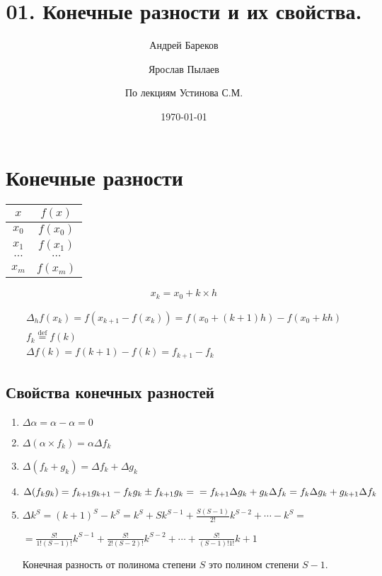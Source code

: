 \documentclass[a4paper,11pt]{article}
\title{01. Конечные разности и их свойства.}
\author{Андрей Бареков \and Ярослав Пылаев \and По лекциям Устинова С.М.}
\date{\today}
\begin{document}
\maketitle
\newpage

\section{Конечные разности}
\begin{minipage}{1\linewidth}
  \begin{wraptable}{l}{2.5cm}
    \begin{tabular}{ c|c }
      $x$ & $f(x)$ \\
      \hline
      $x_0$ & $f(x_0)$ \\
      $x_1$ & $f(x_1)$ \\
      $\cdots$ & $\cdots$ \\
      $x_m$ & $f(x_m)$
    \end{tabular}
    \vspace{1mm}
    \[x_k = x_0 + k \times h\]
  \end{wraptable}

  \begin{gather*}
    \Delta_h f(x_k) = f(x_{k+1} - f(x_k)) = f(x_0 + (k+1)h) - f(x_0 + kh) \\
    f_k \stackrel{\mathrm{def}}{=} f(k) \\
    \Delta f(k) = f(k+1) - f(k) = f_{k+1} - f_k
  \end{gather*}
\end{minipage}

\vspace{1.15cm}

  \subsection{Свойства конечных разностей}
  \begin{enumerate}
    \item \(\Delta \alpha = \alpha - \alpha = 0\)
    \item \(\Delta (\alpha \times f_k) = \alpha \Delta f_k\)
    \item \(\Delta (f_k + g_k) = \Delta f_k + \Delta g_k\)
    \item \(\Delta (f_k g_k) = f_{k+1} g_{k+1} - f_k g_k \pm f_{k+1} g_k = \\
        = f_{k+1} \Delta g_k + g_k \Delta f_k = f_k \Delta g_k + g_{k+1} \Delta f_k\)
    \item \(\Delta k^S = (k+1)^S - k^S = k^S + Sk^{S-1} + \frac{S(S-1)}{2!}k^{S-2} + \cdots - k^S =\)

        \vspace*{0.5mm}
        \(= \frac{S!}{1!(S-1)!}k^{S-1} + \frac{S!}{2!(S-2)!}k^{S-2} + \cdots + \frac{S!}{(S-1)!1!}k + 1\)

        \vspace*{1mm}
        Конечная разность от полинома степени $S$ это полином степени $S-1$.
  \end{enumerate}
\end{document}
